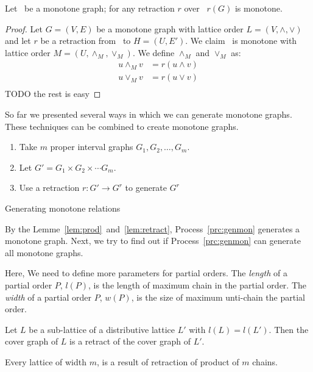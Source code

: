 \begin{lemma}
Let \mG\ be a monotone graph; for any retraction \(r\) over \mG\
\(r(G)\) is monotone.
\end{lemma}

\begin{proof}
Let \(G=(V,E)\) be a monotone graph with lattice order \(L=(V, \wedge,\vee)\) and
let \(r\) be a retraction from \mG\ to \(H=(U,E')\)\@. We claim
\mH\ is monotone with lattice order \(M=(U,\wedge_M, \vee_M)\)\@.
We define \(\wedge_M\) and \(\vee_M\) as:
\begin{eqnarray*}
u \wedge_M v &= r(u \wedge v) \\
u \vee_M v &= r(u \vee v) \\
\end{eqnarray*}
TODO the rest is easy
\end{proof}

So far we presented several ways in which we can generate monotone graphs.
These techniques can be combined to create monotone graphs.
\begin{algorithm}
\begin{enumerate}
\item Take \(m\) proper interval graphs \(G_1,G_2,\dotsc,G_m\)\@.
\item Let \(G' = G_1 \times G_2 \times \dotsb G_m\)\@.
\item Use a retraction \(r:G' \to G^r\) to generate \(G^r\)
\end{enumerate}
\caption{Generating monotone relations}\label{prc:genmon}
\end{algorithm}

By the Lemme~\ref{lem:prod}~and~\ref{lem:retract}, Process~\ref{prc:genmon} generates a monotone graph.
Next, we try to find out if Process~\ref{prc:genmon} can generate all monotone graphs.

Here, We need to define more parameters for partial orders.
The \emph{length} of a partial order \(P\), \(l(P)\), is the length of maximum chain in
the partial order. The \emph{width} of a partial order \(P\),
\(w(P)\), is the size of maximum unti-chain the partial order.

\begin{theorem}  \label{thm:DR}
Let \(L\) be a sub-lattice of a distributive lattice \(L'\) with
\(l(L)=l(L')\)\@. Then the cover graph of \(L\) is a retract of the cover graph of 
\(L'\)\@.
\end{theorem}

\begin{cor}
Every lattice of width \(m\), is a result of retraction of product of
\(m\) chains.
\end{cor}

